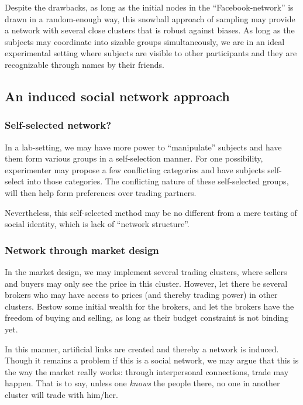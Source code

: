 Despite the drawbacks, as long as the initial nodes in the ``Facebook-network''
is drawn in a random-enough way, this snowball approach of sampling may provide
a network with several close clusters that is robust against biases.
As long as the subjects may coordinate into sizable groups simultaneously, we
are in an ideal experimental setting where subjects are visible to other
participants and they are recognizable through names by their friends.

\subsection{An induced social network approach}

\subsubsection{Self-selected network?}
In a lab-setting, we may have more power to ``manipulate'' subjects and have
them form various groups in a self-selection manner. For one possibility,
experimenter may propose a few conflicting categories and have subjects
self-select into those categories. The conflicting nature of these self-selected
groups, will then help form preferences over trading partners.

Nevertheless, this self-selected method may be no different from a mere testing
of social identity, which is lack of ``network structure''.

\subsubsection{Network through market design}

In the market design, we may implement several trading clusters, where sellers
and buyers may only see the price in this cluster. However, let there be several
brokers who may have access to prices (and thereby trading power) in other
clusters. Bestow some initial wealth for the brokers, and let the brokers have
the freedom of buying and selling, as long as their budget constraint is not
binding yet.

In this manner, artificial links are created and thereby a network is induced.
Though it remains a problem if this is a social network, we may argue that this
is the way the market really works: through interpersonal connections, trade may
happen. That is to say, unless one \textit{knows} the people there, no one in
another cluster will trade with him/her.

